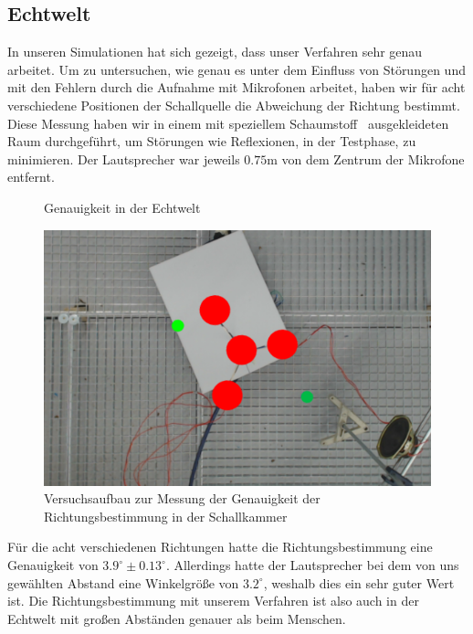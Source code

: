 \subsection{Echtwelt}
In unseren Simulationen hat sich gezeigt, dass unser Verfahren sehr genau arbeitet. Um zu untersuchen, wie genau es unter dem Einfluss von Störungen und mit den Fehlern durch die Aufnahme mit Mikrofonen arbeitet, haben wir für acht verschiedene Positionen der Schallquelle die Abweichung der Richtung bestimmt. Diese Messung haben wir in einem mit speziellem Schaumstoff~\cite{BASOTECT} ausgekleideten Raum durchgeführt, um Störungen wie Reflexionen, in der Testphase, zu minimieren. Der Lautsprecher war jeweils $0.75\mathrm{m}$ von dem Zentrum der Mikrofone entfernt.
\begin{figure}[H]
\begin{minipage}[b]{0.675\textwidth}
  \centering
  \resizebox{!}{0.675\textwidth}{}
  \caption{Genauigkeit in der Echtwelt}
  \label{fig:real}
\end{minipage}
\hfill
\begin{minipage}[b]{0.3\textwidth}
  \centering
  \includegraphics[width=\textwidth]{img/pos_1}
  \caption{Versuchsaufbau zur Messung der Genauigkeit der Richtungsbestimmung in der Schallkammer}
  \label{fig:real_reral}
\end{minipage}
\end{figure}
Für die acht verschiedenen Richtungen hatte die Richtungsbestimmung eine Genauigkeit von $3.9^\circ \pm 0.13^\circ$. Allerdings hatte der Lautsprecher bei dem von uns gewählten Abstand eine Winkelgröße von $3.2^\circ$, weshalb dies ein sehr guter Wert ist. Die Richtungsbestimmung mit unserem Verfahren ist also auch in der Echtwelt mit großen Abständen genauer als beim Menschen.

